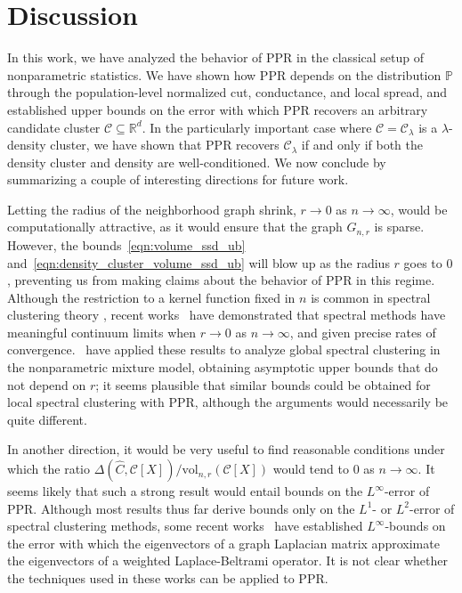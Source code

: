 \documentclass[11pt,twoside]{article}
\theoremstyle{definition}
\newcommand{\Reals}{\mathbb{R}}
\newcommand{\1}{\mathbf{1}}
\newcommand{\Rd}{\Reals^d}
\newcommand{\Leb}{L}
\newcommand{\mc}[1]{\mathcal{#1}}
\newcommand{\Pbb}{\mathbb{P}}
\newcommand{\wh}[1]{\widehat{#1}}
\newcommand{\vol}{\mathrm{vol}}
\begin{document}
\section{Discussion}
\label{sec:discussion}
In this work, we have analyzed the behavior of PPR in the classical setup of nonparametric statistics. We have shown how PPR depends on the distribution $\Pbb$ through the population-level normalized cut, conductance, and local spread, and established upper bounds on the error with which PPR recovers an arbitrary candidate cluster $\mc{C} \subseteq \Rd$.  In the particularly important case where $\mc{C} = \mc{C}_{\lambda}$ is a $\lambda$-density cluster, we have shown that PPR recovers $\mc{C}_{\lambda}$ if and only if both the density cluster and density are well-conditioned. We now conclude by summarizing a couple of interesting directions for future work.

Letting the radius of the neighborhood graph shrink, $r \to 0$ as $n \to  
\infty$, would be computationally attractive, as it would ensure that the graph 
$G_{n,r}$ is sparse. However, the bounds~\eqref{eqn:volume_ssd_ub} and~\eqref{eqn:density_cluster_volume_ssd_ub} will blow up as the radius $r$ goes to $0$, preventing us from making claims about the behavior of PPR in
this regime. Although the restriction to a kernel function fixed in $n$ is
common in spectral clustering theory \citep{vonluxburg2008, schiebinger2015, singer2017},
recent works~\citep{shi2015, calder2019, garciatrillos18, garciatrillos2020, yuan2020} have demonstrated that spectral methods have meaningful continuum limits when $r \to 0$ as $n \to \infty$, and given precise rates of convergence.~\cite{garciatrillos19} have applied these results to analyze global spectral clustering in the nonparametric mixture model, obtaining asymptotic upper bounds that do not depend on $r$; it seems plausible that similar bounds could be obtained for local spectral clustering with PPR, although the arguments would necessarily be quite different.

In another direction, it would be very useful to find reasonable conditions under which the ratio $\Delta(\wh{C},\mc{C}[X])/\vol_{n,r}(\mc{C}[X])$ would tend to $0$ as $n \to \infty$. It seems likely that such a strong result would entail bounds on the $\Leb^{\infty}$-error of PPR. Although most results thus far derive bounds only on the $\Leb^1$- or $\Leb^2$-error of spectral clustering methods, some recent works~\citep{dunson2020,calder2020} have established $\Leb^{\infty}$-bounds on the error with which the eigenvectors of a graph Laplacian matrix approximate the eigenvectors of a weighted Laplace-Beltrami operator. It is not clear whether the techniques used in these works can be applied to PPR.
\end{document}
